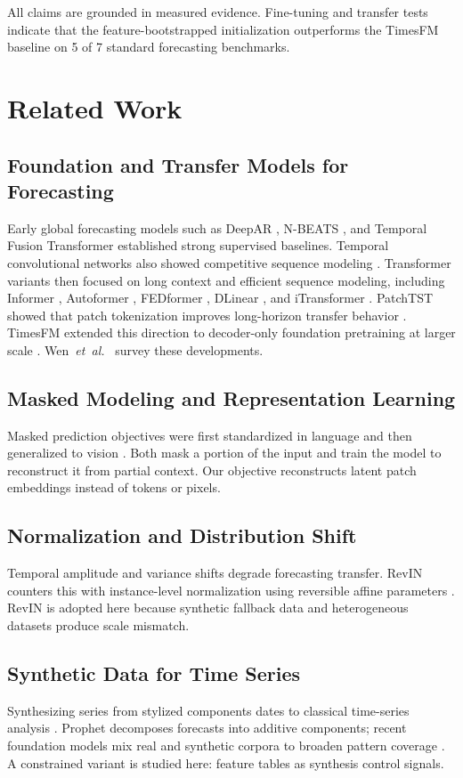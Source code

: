 \documentclass[journal]{IEEEtran}
\begin{document}
All claims are grounded in measured evidence. Fine-tuning and transfer tests indicate that the feature-bootstrapped initialization outperforms the TimesFM baseline on 5 of 7 standard forecasting benchmarks.

\section{Related Work}
\subsection{Foundation and Transfer Models for Forecasting}
Early global forecasting models such as DeepAR \cite{salinas2020deepar}, N-BEATS \cite{oreshkin2020nbeats}, and Temporal Fusion Transformer \cite{lim2021tft} established strong supervised baselines. Temporal convolutional networks also showed competitive sequence modeling \cite{bai2018tcn}. Transformer variants then focused on long context and efficient sequence modeling, including Informer \cite{informer}, Autoformer \cite{autoformer}, FEDformer \cite{fedformer}, DLinear \cite{dlinear}, and iTransformer \cite{itransformer}. PatchTST showed that patch tokenization improves long-horizon transfer behavior \cite{patchtst}. TimesFM extended this direction to decoder-only foundation pretraining at larger scale \cite{timesfm}. Wen~\emph{et~al.}~\cite{wen2023timellm} survey these developments.

\subsection{Masked Modeling and Representation Learning}
Masked prediction objectives were first standardized in language and then generalized to vision \cite{devlin2019bert,he2022mae}. Both mask a portion of the input and train the model to reconstruct it from partial context. Our objective reconstructs latent patch embeddings instead of tokens or pixels.

\subsection{Normalization and Distribution Shift}
Temporal amplitude and variance shifts degrade forecasting transfer. RevIN counters this with instance-level normalization using reversible affine parameters \cite{revin}. RevIN is adopted here because synthetic fallback data and heterogeneous datasets produce scale mismatch.

\subsection{Synthetic Data for Time Series}
Synthesizing series from stylized components dates to classical time-series analysis \cite{box2015}. Prophet \cite{taylor2018prophet} decomposes forecasts into additive components; recent foundation models mix real and synthetic corpora to broaden pattern coverage \cite{timesfm}. A constrained variant is studied here: feature tables as synthesis control signals.
\end{document}
